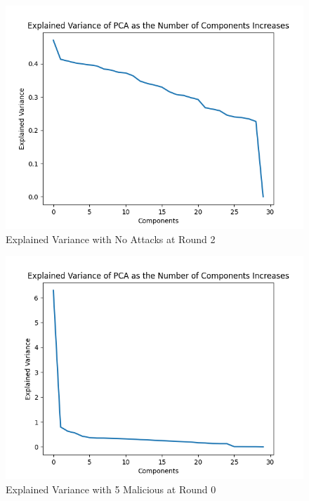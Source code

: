 \begin{figure}[htbp]
	\centering
    \includegraphics[scale=0.5]{my_agg/graphs/0_r2.png}
	\caption{Explained Variance with No Attacks at Round 2}
	\label{fig:pca_02}
\end{figure}

\begin{figure}[htbp]
	\centering
    \includegraphics[scale=0.5]{my_agg/graphs/5_r0.png}
	\caption{Explained Variance with 5 Malicious at Round 0}
	\label{fig:pca_50}
\end{figure}


